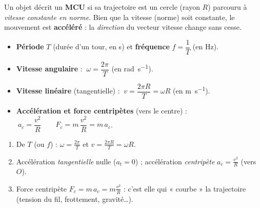 \documentclass[11pt,a4paper]{article}
\newcommand{\vv}[1]{\vec{#1}}\newcommand{\ds}{\displaystyle}
\newcommand{\R}{\mathbb{R}}\newcommand{\N}{\mathbb{N}}\newcommand{\Z}{\mathbb{Z}}
\begin{document}

\noindent Un objet décrit un \textbf{MCU} si sa trajectoire est un cercle (rayon $R$) parcouru à
\emph{vitesse constante en norme}. Bien que la vitesse (norme) soit constante, le mouvement est
\textbf{accéléré} : la \emph{direction} du vecteur vitesse change sans cesse.

\begin{cle}
\begin{itemize}[leftmargin=1.5em,itemsep=2pt]
  \item \textbf{Période} $T$ (durée d'un tour, en \si{\second}) et \textbf{fréquence} $f=\dfrac{1}{T}$ (en \si{\hertz}).
  \item \textbf{Vitesse angulaire} : $\ \omega=\dfrac{2\pi}{T}$ (en \si{\radian\per\second}).
  \item \textbf{Vitesse linéaire} (tangentielle) : $\ \boxed{v=\dfrac{2\pi R}{T}=\omega R}$ (en \si{\metre\per\second}).
  \item \textbf{Accélération et force centripètes} (vers le centre) :
        $\ \boxed{a_c=\dfrac{v^2}{R}}\qquad \boxed{F_c=m\,\dfrac{v^2}{R}=m\,a_c}$.
\end{itemize}
\end{cle}

\begin{center}
\end{center}

\begin{methode}
\begin{enumerate}[label=\arabic*),leftmargin=1.7em,topsep=2pt,itemsep=1.5pt]
  \item De $T$ (ou $f$) : $\omega=\tfrac{2\pi}{T}$ et $v=\tfrac{2\pi R}{T}=\omega R$.
  \item Accélération \emph{tangentielle} nulle ($a_t=0$) ; accélération \emph{centripète} $a_c=\tfrac{v^2}{R}$ (vers $O$).
  \item Force centripète $F_c=m\,a_c=m\tfrac{v^2}{R}$ : c'est elle qui « courbe » la trajectoire (tension du fil, frottement, gravité\dots).
\end{enumerate}
\end{methode}
\end{document}
